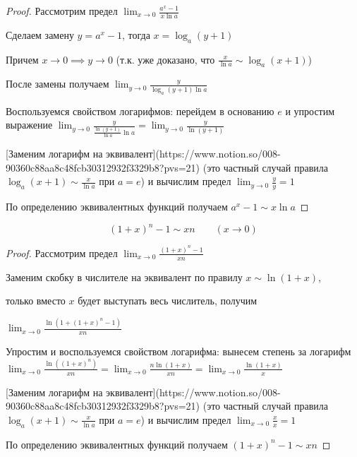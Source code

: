 \begin{proof} \todo
  Рассмотрим предел $\displaystyle{\lim_{x \to 0}{\frac{a^x - 1}{x \ln a}}}$

Сделаем замену $y = a^x - 1$, тогда $x = \log_a (y + 1)$

Причем $x \to 0 \implies y \to 0$ (т.к. уже доказано, что $\displaystyle{\frac{x}{\ln a} \sim \log_a(x + 1)}$)

После замены получаем $\displaystyle{\lim_{y \to 0}{\frac{y}{\log_a(y + 1) \ln a}}}$

Воспользуемся свойством логарифмов: перейдем в основанию $e$ и упростим выражение $\displaystyle{\lim_{y \to 0}{\frac{y}{\frac{\ln (y + 1)}{\ln a} \ln a}} = \lim_{y \to 0}{\frac{y}{\ln (y + 1)}}}$

[Заменим логарифм на эквивалент](https://www.notion.so/008-90360c88aa8c48fcb30312932f3329b8?pvs=21) (это частный случай правила$\displaystyle{\log_a(x+ 1)\sim \frac{x}{\ln a}}$ при $a  =e$) и вычислим предел $\displaystyle{\lim_{y \to 0}{\frac{y}{y}} = 1}$

По определению эквивалентных функций получаем  $a^x - 1 \sim x \ln a$
  
\end{proof}

\begin{theorem}
  \begin{equation*}
    (1 + x)^n - 1 \sim x n
    \qquad
    (x \to 0)
  \end{equation*}
\end{theorem}

\begin{proof} \todo
  
Рассмотрим предел $\displaystyle{\lim_{x \to 0}{\frac{(1 + x)^n - 1}{xn}}}$

Заменим скобку в числителе на эквивалент по правилу $x \sim \ln(1 + x)$,

только вместо $x$ будет выступать весь числитель, получим

$\displaystyle{\lim_{x \to 0}{\frac{\ln(1 + (1 + x)^n - 1)}{xn}}}$

Упростим и воспользуемся свойством логарифма: вынесем степень за логарифм  $\displaystyle{\lim_{x \to 0}{\frac{\ln((1 + x)^n)}{xn}} = \lim_{x \to 0}{\frac{n \ln(1 + x)}{xn}} = \lim_{x \to 0}{\frac{\ln(1 + x)}{x}}}$

[Заменим логарифм на эквивалент](https://www.notion.so/008-90360c88aa8c48fcb30312932f3329b8?pvs=21) (это частный случай правила$\displaystyle{\log_a(x+ 1)\sim \frac{x}{\ln a}}$ при $a  =e$) и вычислим предел $\displaystyle{\lim_{x \to 0}{\frac{x}{x}} = 1}$

По определению эквивалентных функций получаем $(1 + x)^n - 1\sim xn$
  
\end{proof}
